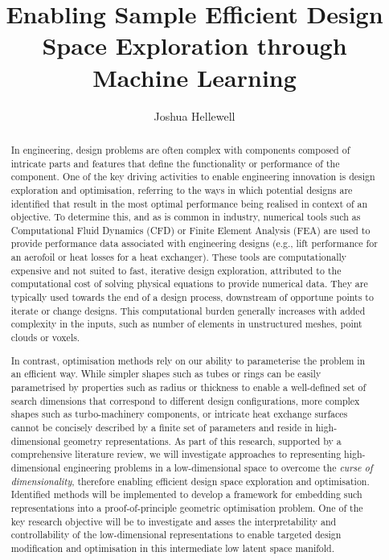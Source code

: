 \documentclass{article}
\title{Enabling Sample Efficient Design Space Exploration through Machine Learning}
\author{Joshua Hellewell}
\begin{document}
\maketitle

\newpage{}

\begin{abstract}
In engineering, design problems are often complex with components composed of intricate parts and features that define the functionality or performance of the component. One of the key driving activities to enable engineering innovation is design exploration and optimisation, referring to the ways in which potential designs are identified that result in the most optimal performance being realised in context of an objective. To determine this, and as is common in industry, numerical tools such as Computational Fluid Dynamics (CFD) or Finite Element Analysis (FEA) are used to provide performance data associated with engineering designs (e.g., lift performance for an aerofoil or heat losses for a heat exchanger). These tools are computationally expensive and not suited to fast, iterative design exploration, attributed to the computational cost of solving physical equations to provide numerical data. They are typically used towards the end of a design process, downstream of opportune points to iterate or change designs. This computational burden generally increases with added complexity in the inputs, such as number of elements in unstructured meshes, point clouds or voxels.

In contrast, optimisation methods rely on our ability to parameterise the problem in an efficient way. While simpler shapes such as tubes or rings can be easily parametrised by properties such as radius or thickness to enable a well-defined set of search dimensions that correspond to different design configurations, more complex shapes such as turbo-machinery components, or intricate heat exchange surfaces cannot be concisely described by a finite set of parameters and reside in high-dimensional geometry representations. As part of this research, supported by a comprehensive literature review, we will investigate approaches to representing high-dimensional engineering problems in a low-dimensional space to overcome the \textit{curse of dimensionality}, therefore enabling efficient design space exploration and optimisation. Identified methods will be implemented to develop a framework for embedding such representations into a proof-of-principle geometric optimisation problem. One of the key research objective will be to investigate and asses the interpretability and controllability of the low-dimensional representations to enable targeted design modification and optimisation in this intermediate low latent space manifold.
\end{abstract}
\end{document}
